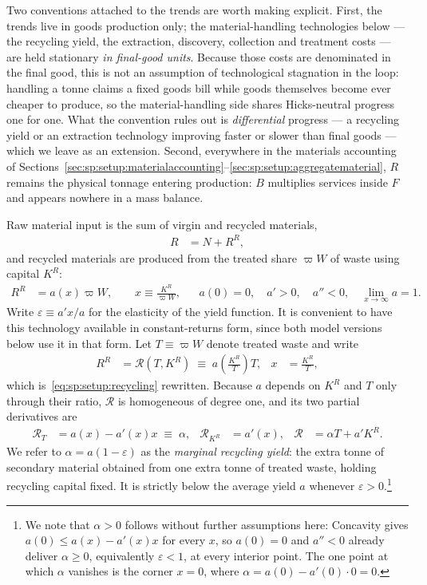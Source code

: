 Two conventions attached to the trends are worth making explicit. First, the trends live in
goods production only; the material-handling technologies below --- the recycling yield, the
extraction, discovery, collection and treatment costs --- are held stationary \emph{in
final-good units}. Because those costs are denominated in the final good, this is not an
assumption of technological stagnation in the loop: handling a tonne claims a fixed goods
bill while goods themselves become ever cheaper to produce, so the material-handling side
shares Hicks-neutral progress one for one. What the convention rules out is
\emph{differential} progress --- a recycling yield or an extraction technology improving
faster or slower than final goods --- which we leave as an extension. Second, everywhere in
the materials accounting of Sections~\ref{sec:sp:setup:materialaccounting}--\ref{sec:sp:setup:aggregatematerial},
$R$ remains the physical tonnage entering production: $B$ multiplies services inside $F$ and
appears nowhere in a mass balance.

 Raw material input is the sum of virgin and recycled materials,
\begin{align}
R &= N + R^R,
\label{eq:sp:setup:materials}
\end{align}
and recycled materials are produced from the treated share $\varpi W$ of waste using capital $K^R$:
\begin{align}
R^R &= a\!\left(x\right)\varpi W,
\qquad
x\equiv\frac{K^R}{\varpi W},
&&
a(0)=0,\quad a'>0,\quad a''<0,\quad
\lim_{x\to\infty}a=1.
\label{eq:sp:setup:recycling}
\end{align}
Write $\varepsilon\equiv a'x/a$ for the elasticity of the yield function. It is convenient to have this technology available in constant-returns form, since both model
versions below use it in that form. Let $T\equiv\varpi W$ denote treated waste and write
\begin{align}
R^R &= \mathcal R\left(T,K^R\right)\;\equiv\;a\!\left(\frac{K^R}{T}\right)T,
&
x&=\frac{K^R}{T},
\label{eq:sp:setup:recycling-crs}
\end{align}
which is~\eqref{eq:sp:setup:recycling} rewritten. Because $a$ depends on $K^R$ and $T$ only through
their ratio, $\mathcal R$ is homogeneous of degree one, and its two partial derivatives are
\begin{align}
\mathcal R_T &= a\left(x\right)-a'\!\left(x\right)x \;\equiv\;\alpha,
&
\mathcal R_{K^R} &= a'\!\left(x\right),
&
\mathcal R &= \alpha T+a'K^R .
\label{eq:sp:setup:recycling-derivatives}
\end{align}
We refer to $\alpha=a\left(1-\varepsilon\right)$ as the \emph{marginal recycling yield}: the extra
tonne of secondary material obtained from one extra tonne of treated waste, holding recycling
capital fixed. It is strictly below the average yield $a$ whenever $\varepsilon>0$.\footnote{We note that $\alpha>0$ follows without further assumptions here: Concavity gives
$a\left(0\right)\le a\left(x\right)-a'\left(x\right)x$ for every $x$, so $a(0)=0$ and $a''<0$
already deliver $\alpha\geq 0$, equivalently $\varepsilon<1$, at every interior point. The one point at which $\alpha$
vanishes is the corner $x=0$, where $\alpha=a(0)-a'\!\left(0\right)\cdot 0=0$.}

